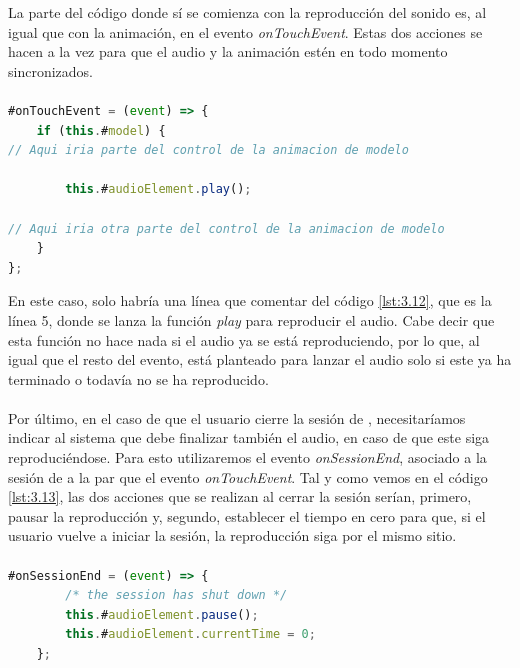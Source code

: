 \documentclass{subfiles}
\begin{document}
        La parte del código donde sí se comienza con la reproducción del sonido es, al igual que con la animación, en el evento \textit{onTouchEvent}. Estas dos acciones se hacen a la vez para que el audio y la animación estén en todo momento sincronizados.

\paragraph{}
\begin{lstlisting}[language=JavaScript, caption={Control del sonido espacial en el evento onTouchEvent.}, label={lst:3.12}]
#onTouchEvent = (event) => {
    if (this.#model) {
// Aqui iria parte del control de la animacion de modelo
    
        this.#audioElement.play();

// Aqui iria otra parte del control de la animacion de modelo
    }
};
\end{lstlisting}

        En este caso, solo habría una línea que comentar del código \ref{lst:3.12}, que es la línea 5, donde se lanza la función \textit{play} para reproducir el audio. Cabe decir que esta función no hace nada si el audio ya se está reproduciendo, por lo que, al igual que el resto del evento, está planteado para lanzar el audio solo si este ya ha terminado o todavía no se ha reproducido.

        \paragraph{}
        Por último, en el caso de que el usuario cierre la sesión de \ra, necesitaríamos indicar al sistema que debe finalizar también el audio, en caso de que este siga reproduciéndose. Para esto utilizaremos el evento \textit{onSessionEnd}, asociado a la sesión de \ra a la par que el evento \textit{onTouchEvent}. Tal y como vemos en el código \ref{lst:3.13}, las dos acciones que se realizan al cerrar la sesión serían, primero, pausar la reproducción y, segundo, establecer el tiempo en cero para que, si el usuario vuelve a iniciar la sesión, la reproducción siga por el mismo sitio.

        \paragraph{}
\begin{lstlisting}[language=JavaScript, caption={Control del sonido en el cierre de la sesión de Realidad Aumentada.}, label={lst:3.13}]
	#onSessionEnd = (event) => {
		/* the session has shut down */
		this.#audioElement.pause();
		this.#audioElement.currentTime = 0;
	};
\end{lstlisting}
\end{document}

